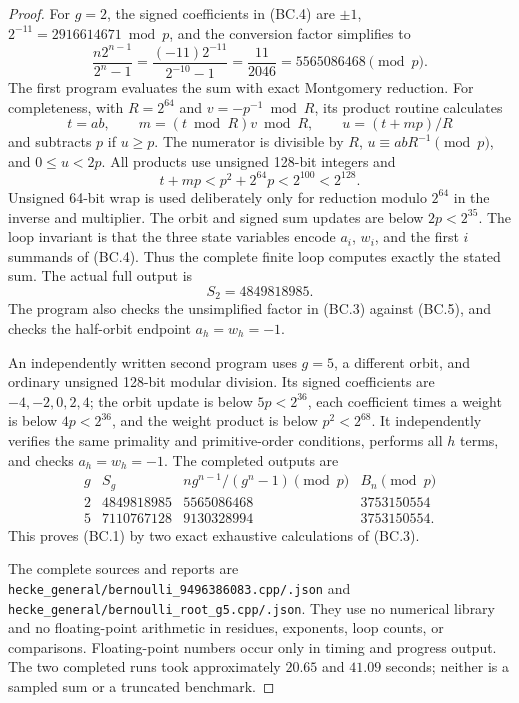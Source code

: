 \begin{proof}
For $g=2$, the signed coefficients in (BC.4) are $\pm1$,
$2^{-11}=2916614671\bmod p$, and the conversion factor simplifies to
\[
 \frac{n2^{n-1}}{2^n-1}
 =\frac{(-11)2^{-11}}{2^{-10}-1}
 =\frac{11}{2046}
 =5565086468\pmod p.
 \tag{BC.5}
\]
The first program evaluates the sum with exact Montgomery reduction.
For completeness, with $R=2^{64}$ and $v=-p^{-1}\bmod R$, its product
routine calculates
\[
 t=ab,\qquad m=(t\bmod R)v\bmod R,\qquad u=(t+mp)/R
\]
and subtracts $p$ if $u\ge p$.
The numerator is divisible by $R$,
$u\equiv abR^{-1}\pmod p$, and $0\le u<2p$.
All products use unsigned 128-bit integers and
\[
                 t+mp<p^2+2^{64}p<2^{100}<2^{128}.
\]
Unsigned 64-bit wrap is used deliberately only for reduction modulo
$2^{64}$ in the inverse and multiplier.
The orbit and signed sum updates are below $2p<2^{35}$.
The loop invariant is that the three state variables encode
$a_i$, $w_i$, and the first $i$ summands of (BC.4).
Thus the complete finite loop computes exactly the stated sum.
The actual full output is
\[
                         S_2=4849818985.
\]
The program also checks the unsimplified factor in (BC.3) against
(BC.5), and checks the half-orbit endpoint $a_h=w_h=-1$.

An independently written second program uses $g=5$, a different orbit,
and ordinary unsigned 128-bit modular division. Its signed coefficients
are $-4,-2,0,2,4$; the orbit update is below $5p<2^{36}$,
each coefficient times a weight is below $4p<2^{36}$, and the
weight product is below $p^2<2^{68}$. It independently verifies the
same primality and primitive-order conditions, performs all $h$ terms,
and checks $a_h=w_h=-1$. The completed outputs are
\[
\begin{array}{c|r|r|r}
g&S_g&n g^{n-1}/(g^n-1)\pmod p&B_n\pmod p\\ \hline
2&4849818985&5565086468&3753150554\\
5&7110767128&9130328994&3753150554.
\end{array}
\]
This proves (BC.1) by two exact exhaustive calculations of (BC.3).

The complete sources and reports are
\texttt{hecke\_general/bernoulli\_9496386083.cpp/.json} and
\texttt{hecke\_general/bernoulli\_root\_g5.cpp/.json}.
They use no numerical library and no floating-point arithmetic in
residues, exponents, loop counts, or comparisons.
Floating-point numbers occur only in timing and progress output.
The two completed runs took approximately $20.65$ and $41.09$ seconds;
neither is a sampled sum or a truncated benchmark.
\end{proof}
